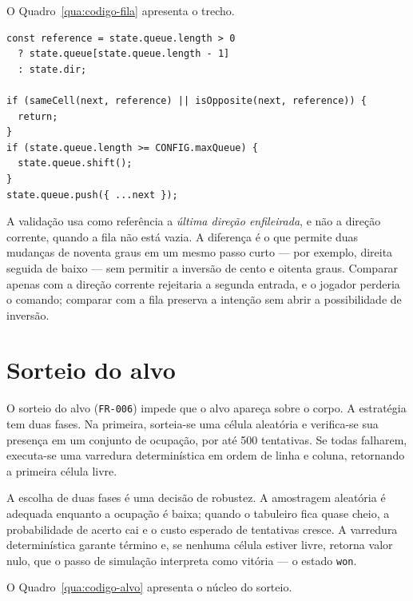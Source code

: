 

O Quadro~\ref{qua:codigo-fila} apresenta o trecho.

\begin{quadro}[htb]
	\caption{Trecho do enfileiramento de direção com bloqueio de inversão (excertado)}
	\label{qua:codigo-fila}
	\begin{lstlisting}[style=codigo]
const reference = state.queue.length > 0
  ? state.queue[state.queue.length - 1]
  : state.dir;

if (sameCell(next, reference) || isOpposite(next, reference)) {
  return;
}
if (state.queue.length >= CONFIG.maxQueue) {
  state.queue.shift();
}
state.queue.push({ ...next });
	\end{lstlisting}
\end{quadro}

A validação usa como referência a \emph{última direção enfileirada}, e não a
direção corrente, quando a fila não está vazia. A diferença é o que permite duas
mudanças de noventa graus em um mesmo passo curto --- por exemplo, direita seguida
de baixo --- sem permitir a inversão de cento e oitenta graus. Comparar apenas
com a direção corrente rejeitaria a segunda entrada, e o jogador perderia o
comando; comparar com a fila preserva a intenção sem abrir a possibilidade de
inversão.

\section{Sorteio do alvo}
\label{sec:impl-alvo}

O sorteio do alvo (\texttt{FR-006}) impede que o alvo apareça sobre o corpo. A
estratégia tem duas fases. Na primeira, sorteia-se uma célula aleatória e verifica-se
sua presença em um conjunto de ocupação, por até 500 tentativas. Se todas
falharem, executa-se uma varredura determinística em ordem de linha e coluna,
retornando a primeira célula livre.

A escolha de duas fases é uma decisão de robustez. A amostragem aleatória é
adequada enquanto a ocupação é baixa; quando o tabuleiro fica quase cheio, a
probabilidade de acerto cai e o custo esperado de tentativas cresce. A varredura
determinística garante término e, se nenhuma célula estiver livre, retorna valor
nulo, que o passo de simulação interpreta como vitória --- o estado
\texttt{won}.

O Quadro~\ref{qua:codigo-alvo} apresenta o núcleo do sorteio.

